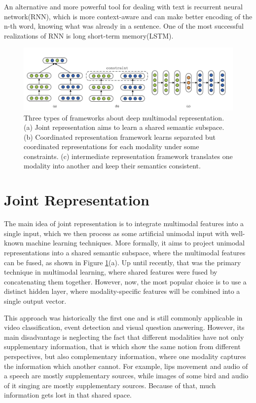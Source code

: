 An alternative and more powerful tool for dealing with text is recurrent neural network(RNN)\cite{ref_rnn}, which is more context-aware and can make better encoding of the n-th word, knowing what was already in a sentence. One of the most successful realizations of RNN is long short-term memory(LSTM)\cite{ref_lstm}.

\begin{figure}
\includegraphics[width=\textwidth]{Resources/multimodal_learning_types.png}
\caption{Three types of frameworks about deep multimodal representation. (a) Joint representation aims to learn a shared semantic subspace.(b) Coordinated representation framework learns separated but coordinated representations for each modality under some constraints.
(c) intermediate representation framework translates one modality into another and keep their semantics consistent.\cite{ref_survey}} \label{fig1}
\end{figure}

\section{Joint Representation}
The main idea of joint representation is to integrate multimodal features into a single input, which we then process as some artificial unimodal input with well-known machine learning techniques. More formally, it aims to project unimodal representations into a shared semantic subspace, where the multimodal features can be fused\cite{ref_survey_baltrusaitis},  as shown in Figure \ref{fig1}(a). Up until recently, that was the primary technique in multimodal learning, where shared features were fused by concatenating them together. However, now,  the most popular choice is to use a distinct hidden layer, where modality-specific features will be combined into a single output vector.

This approach was historically the first one and is still commonly applicable in video classification\cite{ref_video_class}, event detection\cite{ref_event_detection} and visual question answering\cite{ref_visual_question_answ}. However, its main disadvantage is neglecting the fact that different modalities have not only supplementary information, that is which show the same notion from different perspectives, but also complementary information, where one modality captures the information which another cannot. For example, lips movement and audio of a speech are mostly supplementary sources, while images of some bird and audio of it singing are mostly supplementary sources. Because of that, much information gets lost in that shared space. 


